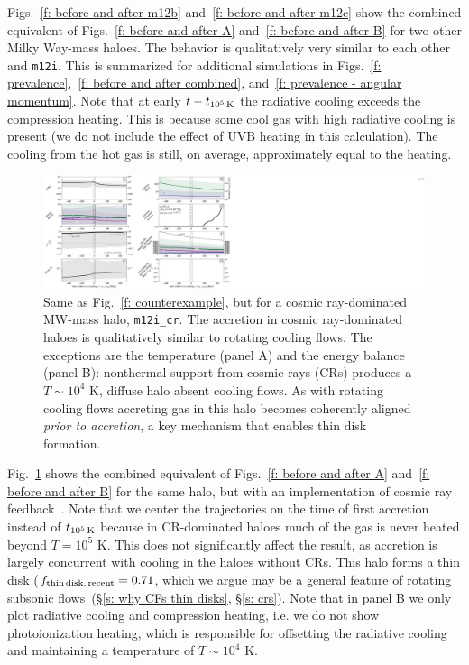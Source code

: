 \documentclass[fleqn,usenatbib]{mnras}
\newcommand{\fthin}{f_{\rm thin\,disk,\,recent}}
\newcommand{\tcools}{t_{10^5\,{\rm K}}}
\begin{document}
Figs.~\ref{f: before and after m12b} and~\ref{f: before and after m12c} show the combined equivalent of Figs.~\ref{f: before and after A} and~\ref{f: before and after B} for two other Milky Way-mass haloes.
The behavior is qualitatively very similar to each other and \texttt{m12i}.
This is summarized for additional simulations in Figs.~\ref{f: prevalence},~\ref{f: before and after combined}, and~\ref{f: prevalence - angular momentum}.
Note that at early $t - \tcools$ the radiative cooling exceeds the compression heating.
This is because some cool gas with high radiative cooling is present (we do not include the effect of UVB heating in this calculation).
The cooling from the hot gas is still, on average, approximately equal to the heating.


\begin{figure}
\includegraphics[width=\textwidth]{figures/before_and_after/before_and_after_allone_m12i_cr.pdf}
\caption{
Same as Fig.~\ref{f: counterexample}, but for a cosmic ray-dominated MW-mass halo, \texttt{m12i\_cr}.
The accretion in cosmic ray-dominated haloes is qualitatively similar to rotating cooling flows.
The exceptions are the temperature (panel A) and the energy balance (panel B): nonthermal support from cosmic rays (CRs) produces a $T\sim 10^4$ K, diffuse halo absent cooling flows.
As with rotating cooling flows accreting gas in this halo becomes coherently aligned \textit{prior to accretion}, a key mechanism that enables thin disk formation.
}
\label{f: before and after m12i cr}
\end{figure}

Fig.~\ref{f: before and after m12i cr} shows the combined equivalent of Figs.~\ref{f: before and after A} and~\ref{f: before and after B} for the same halo, but with an implementation of cosmic ray feedback~\cite{Chan2019, Hopkins2020a}.
Note that we center the trajectories on the time of first accretion instead of $\tcools$ because in CR-dominated haloes much of the gas is never heated beyond $T = 10^5$ K.
This does not significantly affect the result, as accretion is largely concurrent with cooling in the haloes without CRs.
This halo forms a thin disk ($\fthin=0.71$, which we argue may be a general feature of rotating subsonic flows~(\S\ref{s: why CFs thin disks}, \S\ref{s: crs}).
Note that in panel B we only plot radiative cooling and compression heating, i.e. we do not show photoionization heating, which is responsible for offsetting the radiative cooling and maintaining a temperature of $T \sim 10^4$ K.
\end{document}
